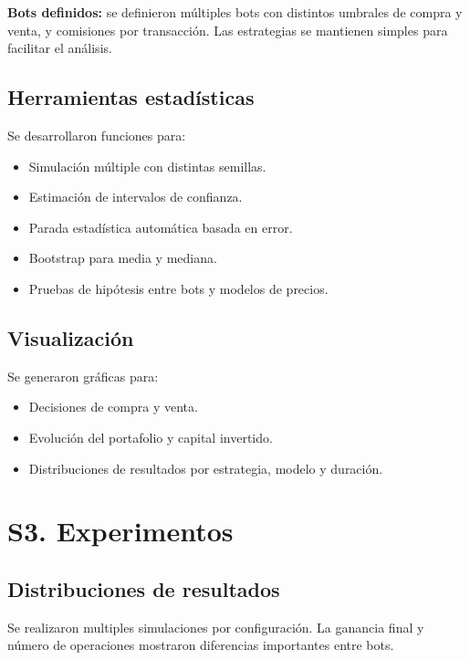 \documentclass[a4paper,12pt]{article}
\begin{document}
\textbf{Bots definidos:} se definieron múltiples bots con distintos umbrales de 
compra y venta, y comisiones por transacción. Las estrategias se mantienen 
simples para facilitar el análisis.

\subsection*{Herramientas estadísticas}
Se desarrollaron funciones para:
\begin{itemize}
  \item Simulación múltiple con distintas semillas.
  \item Estimación de intervalos de confianza.
  \item Parada estadística automática basada en error.
  \item Bootstrap para media y mediana.
  \item Pruebas de hipótesis entre bots y modelos de precios.
\end{itemize}

\subsection*{Visualización}
Se generaron gráficas para:
\begin{itemize}
  \item Decisiones de compra y venta.
  \item Evolución del portafolio y capital invertido.
  \item Distribuciones de resultados por estrategia, modelo y duración.
\end{itemize}

\section*{S3. Experimentos}

\subsection*{Distribuciones de resultados}
Se realizaron multiples simulaciones por configuración. La ganancia final y número de operaciones mostraron diferencias importantes entre bots.

\end{document}
